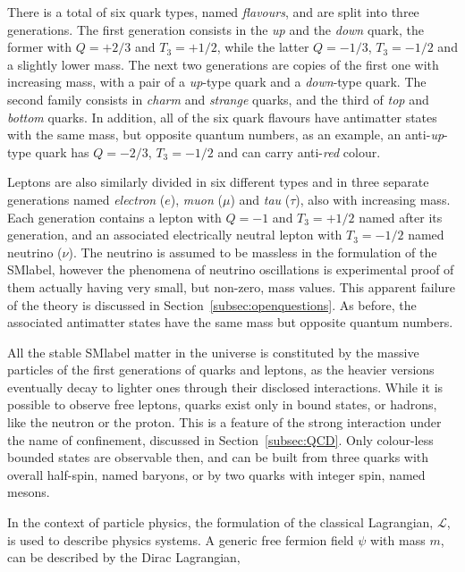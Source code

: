 There is a total of six quark types, named \textit{flavours}, and are split into three generations.
The first generation consists in the \textit{up} and the \textit{down} quark, the former with $Q=+2/3$ and $T_3=+1/2$,
while the latter $Q=-1/3$, $T_3=-1/2$ and a slightly lower mass.
The next two generations are copies of the first one with increasing mass, with a pair of a
\textit{up}-type quark and a \textit{down}-type quark.
The second family consists in \textit{charm} and \textit{strange} quarks, and the third of \textit{top} and \textit{bottom} quarks.
In addition, all of the six quark flavours have antimatter states with the same mass, but opposite quantum numbers, as an example,
an anti-\textit{up}-type quark has $Q=-2/3$, $T_3=-1/2$ and can carry anti-\textit{red} colour.

Leptons are also similarly divided in six different types and in three separate generations named
\textit{electron} ($e$), \textit{muon} ($\mu$) and \textit{tau} ($\tau$), also with increasing mass.
Each generation contains a lepton with $Q=-1$ and $T_3=+1/2$ named after its generation,
and an associated electrically neutral lepton with $T_3=-1/2$ named neutrino ($\nu$).
The neutrino is assumed to be massless in the formulation of the \acrshort{SMlabel},
however the phenomena of neutrino oscillations is experimental proof of them actually having very small, but non-zero, mass values.
This apparent failure of the theory is discussed in Section~\ref{subsec:openquestions}. As before, the associated antimatter states have the same mass but opposite quantum numbers.

All the stable \acrshort{SMlabel} matter in the universe is constituted by the massive particles of the first generations of quarks
and leptons, as the heavier versions eventually decay to lighter ones through their disclosed interactions.
While it is possible to observe free leptons, quarks exist only in bound states, or hadrons, like the neutron or the proton.
This is a feature of the strong interaction under the name of confinement, discussed in Section~\ref{subsec:QCD}.
Only colour-less bounded states are observable then, and can be built from three quarks with overall half-spin, named baryons,
or by two quarks with integer spin, named mesons.

In the context of particle physics, the formulation of the classical Lagrangian, $\mathcal{L}$, is used to describe physics systems.
A generic free fermion field $\psi$ with mass $m$, can be described by the Dirac Lagrangian, 

